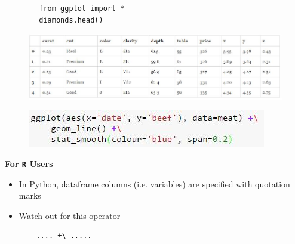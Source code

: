 \documentclass{beamer}
\begin{document}
\begin{frame}[fragile]
	\begin{framed}
		\begin{verbatim}
		from ggplot import *
		diamonds.head()
		\end{verbatim}
	\end{framed}
	\begin{figure}
		\centering
		\includegraphics[width=1.1\linewidth]{diamondsdata}
		
	\end{figure}
	
\end{frame}	
\begin{frame}[fragile]
	\Large

	\begin{figure}
\centering
\includegraphics[width=1.05\linewidth]{plusoperator}
\end{figure}
\end{frame}
\begin{frame}[fragile]
\Large
\vspace{-0.4cm}
\noindent \textbf{For \texttt{R}  Users}
\begin{itemize}
	\item  In Python, dataframe columns (i.e. variables) are specified with quotation marks
\item Watch out for this operator
\begin{framed}
	\begin{verbatim}
	.... +\ .....
	\end{verbatim}
\end{framed}
\end{itemize}
\end{frame}
\end{document}
